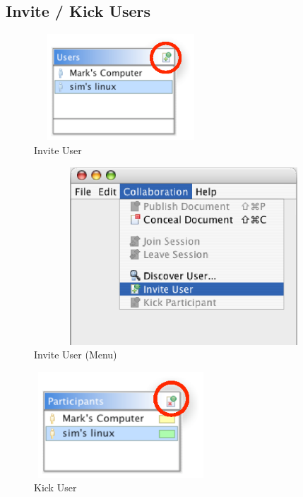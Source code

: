 \documentclass[11pt,a4paper]{article}
\begin{document}
\subsection{Invite / Kick Users}
\begin{figure}[H]
\begin{center}
  \includegraphics[height=1.56in, width=2.56in]{../images/usermanual/g_uview_invite.eps}
\caption{Invite User}
\label{default}
\end{center}
\end{figure}

\begin{figure}[H]
\begin{center}
  \includegraphics[height=2.62in, width=6.31in]{../images/usermanual/menu_collab_invite.eps}
\caption{Invite User (Menu)}
\label{default}
\end{center}
\end{figure}

\begin{figure}[H]
\begin{center}
  \includegraphics[height=1.56in, width=2.56in]{../images/usermanual/g_pview_kick.eps}
\caption{Kick User}
\label{default}
\end{center}
\end{figure}
\end{document}
